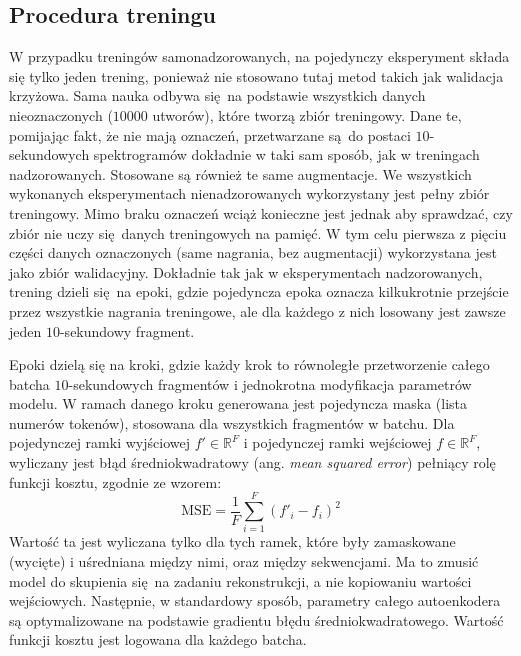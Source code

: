 \subsection{Procedura treningu}

W przypadku treningów samonadzorowanych, na pojedynczy eksperyment składa się tylko jeden trening,
ponieważ nie stosowano tutaj metod takich jak walidacja krzyżowa. Sama nauka odbywa się na podstawie
wszystkich danych nieoznaczonych ($10000$ utworów), które tworzą zbiór treningowy. Dane te,
pomijając fakt, że nie mają oznaczeń, przetwarzane są do postaci $10$-sekundowych spektrogramów
dokładnie w taki sam sposób, jak w treningach nadzorowanych. Stosowane są również te same
augmentacje. We wszystkich wykonanych eksperymentach nienadzorowanych wykorzystany jest pełny zbiór
treningowy. Mimo braku oznaczeń wciąż konieczne jest jednak aby sprawdzać, czy zbiór nie uczy
się danych treningowych na pamięć. W tym celu pierwsza z pięciu części danych oznaczonych (same
nagrania, bez augmentacji) wykorzystana jest jako zbiór walidacyjny. Dokładnie tak jak w
eksperymentach nadzorowanych, trening dzieli się na epoki, gdzie pojedyncza epoka oznacza
kilkukrotnie przejście przez wszystkie nagrania treningowe, ale dla każdego z nich losowany jest
zawsze jeden $10$-sekundowy fragment.

Epoki dzielą się na kroki, gdzie każdy krok to równoległe przetworzenie całego batcha
$10$-sekundowych fragmentów i jednokrotna modyfikacja parametrów modelu. W ramach danego kroku
generowana jest pojedyncza maska (lista numerów tokenów), stosowana dla wszystkich fragmentów w
batchu. Dla pojedynczej ramki wyjściowej $f' \in \mathbb{R}^F$ i pojedynczej ramki wejściowej $f \in
\mathbb{R}^F$, wyliczany jest błąd średniokwadratowy (ang. \emph{mean squared error}) pełniący rolę
funkcji kosztu, zgodnie ze wzorem:
\begin{equation}
    \textrm{MSE} = \frac{1}{F} \sum_{i=1}^{F} (f'_{i} - f_{i})^2
\end{equation}
Wartość ta jest wyliczana tylko dla tych ramek, które były zamaskowane (wycięte) i uśredniana między
nimi, oraz między sekwencjami. Ma to zmusić model do skupienia się na zadaniu rekonstrukcji, a nie
kopiowaniu wartości wejściowych.  Następnie, w standardowy sposób, parametry całego autoenkodera są
optymalizowane na podstawie gradientu błędu średniokwadratowego.  Wartość funkcji kosztu jest
logowana dla każdego batcha.

